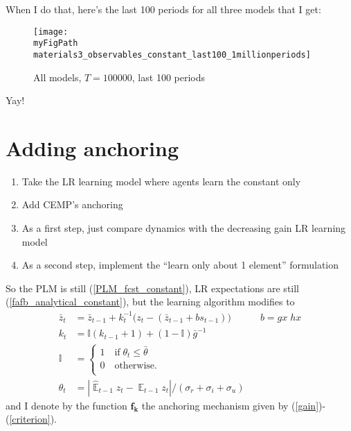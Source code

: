 \documentclass[11pt]{article}
\def \myFigPath {../figures/}
\renewcommand{\[}{\begin{equation}}
\renewcommand{\]}{\end{equation}}
\DeclareMathOperator{\E}{\mathbb{E}}
\def\myFigScale{0.3}
\begin{document}
 When I do that, here's the last 100 periods for all three models that I get:
\begin{figure}[h!]
\texttt{[image: \\myFigPath materials3\_observables\_constant\_last100\_1millionperiods]} 
\caption{All models, $T = 100000$, last 100 periods}
\end{figure}
 Yay!
 
\section{Adding anchoring}
 \begin{enumerate}
 \item Take the LR learning model where agents learn the constant only
 \item Add CEMP's anchoring
 \item As a first step, just compare dynamics with the decreasing gain LR learning model
 \item As a second step, implement the ``learn only about 1 element'' formulation
 \end{enumerate}

So the PLM is still (\ref{PLM_fcst_constant}), LR expectations are still (\ref{fafb_analytical_constant}), but the learning algorithm modifies to
 \begin{align}
\bar{z}_{t} & = \bar{z}_{t-1} +k_t^{-1}\big(z_{t} -(\bar{z}_{t-1}+bs_{t-1}) \big) \quad  \quad \quad b= gx\;hx \label{RLS_anchoring} \\
k_t &= \mathbb{I}(k_{t-1} +1) + (1-\mathbb{I})\bar{g}^{-1} \label{gain} \\
\mathbb{I} & = \begin{cases} 1 \quad \text{if} \; \theta_t \leq \bar{\theta}  \\ 0 \quad \text{otherwise.}\\
\end{cases} \\
\theta_t & = |\hat{\E}_{t-1}z_t - \E_{t-1}z_t| / (\sigma_r + \sigma_i + \sigma_u) \label{criterion}
\end{align}
and I denote by the function $\mathbf{f_k}$ the anchoring mechanism given by (\ref{gain})-(\ref{criterion}).
\end{document}
